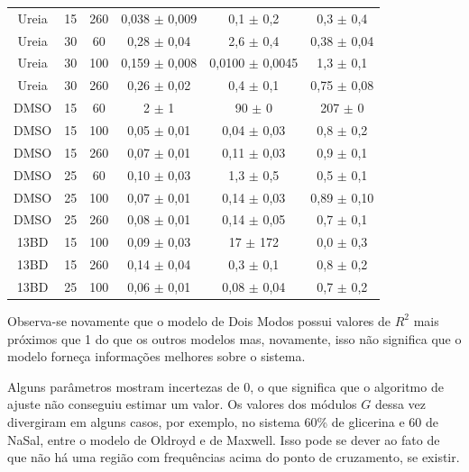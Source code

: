 \begin{table}[h]
{\begin{tabular}{c c c c c c}
				  Ureia   & 15      & 260     & 0,038 \(\pm\) 0,009 & 0,1     \(\pm\)     0,2     & 0,3   \(\pm\)   0,4     \\
				  Ureia   & 30      & 60      & 0,28  \(\pm\) 0,04  & 2,6     \(\pm\)     0,4     & 0,38  \(\pm\)  0,04     \\
				  Ureia   & 30      & 100     & 0,159 \(\pm\) 0,008 & 0,0100  \(\pm\)      0,0045 & 1,3   \(\pm\)    0,1     \\
				  Ureia   & 30      & 260     & 0,26  \(\pm\) 0,02  & 0,4     \(\pm\)     0,1     & 0,75  \(\pm\)  0,08     \\ \midrule
				  DMSO    & 15      & 60      & 2  \(\pm\) 1        & 90      \(\pm\)    0        & 207   \(\pm\)        0     \\
				  DMSO    & 15      & 100     & 0,05  \(\pm\) 0,01  & 0,04    \(\pm\) 0,03        & 0,8   \(\pm\)       0,2  \\
				  DMSO    & 15      & 260     & 0,07  \(\pm\) 0,01  & 0,11    \(\pm\) 0,03        & 0,9   \(\pm\)       0,1  \\
				  DMSO    & 25      & 60      & 0,10  \(\pm\) 0,03  & 1,3     \(\pm\)     0,5     & 0,5   \(\pm\)    0,1     \\
				  DMSO    & 25      & 100     & 0,07  \(\pm\) 0,01  & 0,14    \(\pm\) 0,03        & 0,89  \(\pm\)       0,10 \\
				  DMSO    & 25      & 260     & 0,08  \(\pm\) 0,01  & 0,14    \(\pm\) 0,05        & 0,7   \(\pm\)       0,1  \\
				  13BD    & 15      & 100     & 0,09  \(\pm\) 0,03  & 17      \(\pm\)     172     & 0,0   \(\pm\)       0,3  \\
				  13BD    & 15      & 260     & 0,14  \(\pm\) 0,04  & 0,3     \(\pm\)     0,1     & 0,8   \(\pm\)    0,2     \\
				  13BD    & 25      & 100     & 0,06  \(\pm\) 0,01  & 0,08    \(\pm\) 0,04        & 0,7   \(\pm\)       0,2  \\ \bottomrule
			\end{tabular} 
		}{} 
\end{table} 

		\FloatBarrier
		
		Observa-se novamente que o modelo de Dois Modos possui valores de \(R^2\) mais próximos que 1 do que os outros modelos mas, novamente, isso não significa que o modelo forneça informações melhores sobre o sistema.
		
		Alguns parâmetros mostram incertezas de 0, o que significa que o algoritmo de ajuste não conseguiu estimar um valor. Os valores dos módulos \(G\) dessa vez divergiram em alguns casos, por exemplo, no sistema 60\% de glicerina e 60 \mM{} de NaSal, entre o modelo de Oldroyd e de Maxwell. Isso pode se dever ao fato de que não há uma região com frequências acima do ponto de cruzamento, se existir.
		
